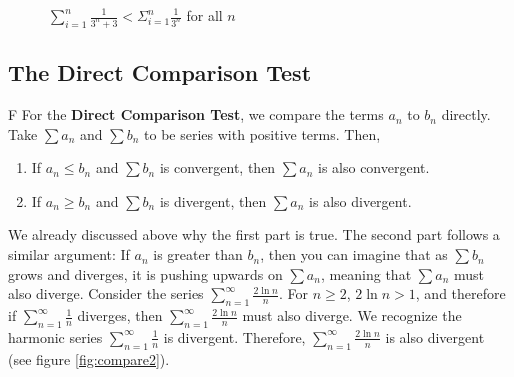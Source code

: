 \begin{figure}
    \centering
    \caption{$\sum_{i=1}^n \frac{1}{3^n + 3} < \Sigma_{i = 1}^n 
    \frac{1}{3^n}$ for all $n$}
    \label{fig:compare1}
\end{figure}
\subsection{The Direct Comparison Test}
F For the \textbf{Direct Comparison Test}, we 
compare the terms $a_n$ to $b_n$ directly. Take $\sum a_n$ and $\sum b_n$ to 
be series with positive terms. Then, 
\begin{enumerate}
\item If $a_n \leq b_n$ and $\sum b_n$ is convergent, then $\sum a_n$ is 
also convergent.
\item If $a_n \geq b_n$ and $\sum b_n$ is divergent, then $\sum a_n$ is 
also divergent.
\end{enumerate}

We already discussed above why the first part is true. The second part follows 
a similar argument: If $a_n$ is greater than $b_n$, then you can imagine that 
as $\sum b_n$ grows and diverges, it is pushing upwards on $\sum a_n$, 
meaning that $\sum a_n$ must also diverge. Consider the series $\sum_{n=1}^
\infty \frac{2\ln{n}}{n}$. For $n \geq 2$, $2\ln{n} > 1$, and therefore if 
$\sum_{n=1}^\infty \frac{1}{n}$ diverges, then $\sum_{n=1}^\infty \frac{2
\ln{n}}{n}$ must also diverge. We recognize the harmonic series $\sum_{n=1}^
\infty \frac{1}{n}$ is divergent. Therefore, $\sum_{n=1}^\infty 
\frac{2\ln{n}}{n}$ is also divergent (see figure \ref{fig:compare2}).

